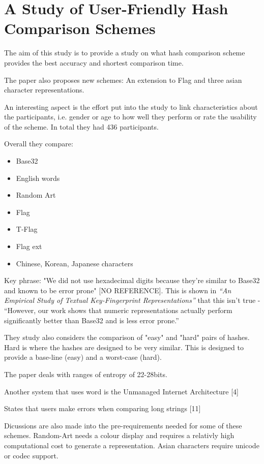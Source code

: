 \section{A Study of User-Friendly Hash Comparison Schemes}

The aim of this study is to provide a study on what hash comparison scheme provides the best accuracy and shortest comparison time.

The paper also proposes new schemes: An extension to Flag and three asian character representations. 

An interesting aspect is the effort put into the study to link characteristics about the participants, i.e. gender or age to how well they perform or rate the usability of the scheme. In total they had 436 participants.

Overall they compare:
\begin{itemize}
    \item Base32
    \item English words
    \item Random Art
    \item Flag
    \item T-Flag
    \item Flag ext
    \item Chinese, Korean, Japanese characters
\end{itemize}

Key phrase: "We did not use hexadecimal digits because they're similar to Base32 and known to be error prone" [NO REFERENCE]. This is shown in \textit{``An Empirical Study of Textual Key-Fingerprint Representations''} that this isn't true - ``However, our work shows that numeric representations actually perform significantly better than Base32 and is less error prone.''

They study also considers the comparison of "easy" and "hard" pairs of hashes. Hard is where the hashes are designed to be very similar. This is designed to provide a base-line (easy) and a worst-case (hard).

The paper deals with ranges of entropy of 22-28bits.

Another system that uses word is the Unmanaged Internet Architecture [4]

States that users make errors when comparing long strings [11]

Dicussions are also made into the pre-requirements needed for some of these schemes. Random-Art needs a colour display and requires a relativly high computational cost to generate a representation. Asian characters require unicode or codec support.

